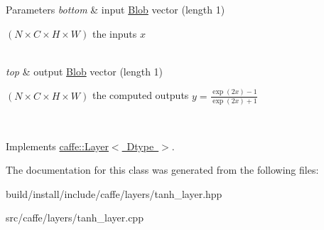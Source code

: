\begin{DoxyParams}{Parameters}
{\em bottom} & input \mbox{\hyperlink{classcaffe_1_1_blob}{Blob}} vector (length 1)
\begin{DoxyEnumerate}
\item $ (N \times C \times H \times W) $ the inputs $ x $ 
\end{DoxyEnumerate}\\
\hline
{\em top} & output \mbox{\hyperlink{classcaffe_1_1_blob}{Blob}} vector (length 1)
\begin{DoxyEnumerate}
\item $ (N \times C \times H \times W) $ the computed outputs $ y = \frac{\exp(2x) - 1}{\exp(2x) + 1} $ 
\end{DoxyEnumerate}\\
\hline
\end{DoxyParams}


Implements \mbox{\hyperlink{classcaffe_1_1_layer_a576ac6a60b1e99fe383831f52a6cea77}{caffe\+::\+Layer$<$ Dtype $>$}}.



The documentation for this class was generated from the following files\+:\begin{DoxyCompactItemize}
\item 
build/install/include/caffe/layers/tanh\+\_\+layer.\+hpp\item 
src/caffe/layers/tanh\+\_\+layer.\+cpp\end{DoxyCompactItemize}
